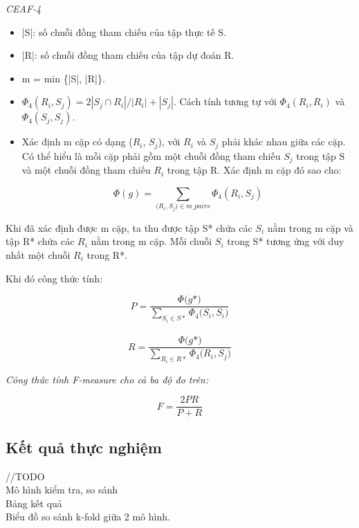 \documentclass[12pt]{report}
\begin{document}
					\textit{CEAF-4}
				\begin{itemize}
					\item{|S|: số chuỗi đồng tham chiếu của tập thực tế S.}
					\item{|R|: số chuỗi đồng tham chiếu của tập dự đoán R.}
					\item{m = min \{|S|, |R|\}.}
					\item{$\Phi_4(R_i,S_j) = 2 |S_j \cap R_i|/ |R_i| + |S_j|$. Cách tính tương tự với $\Phi_4(R_i,R_i)$ và $\Phi_4(S_j,S_j)$.}  
					\item{Xác định m cặp có dạng ($R_i$, $S_j$), với $R_i$ và $S_j$ phải khác nhau giữa các cặp. Có thể hiểu là mỗi cặp phải gồm một chuỗi đồng tham chiếu $S_j$ trong tập S và một chuỗi đồng tham chiếu $R_i$ trong tập R. Xác định m cặp đó sao cho: 
					\begin{center}
						\begin{equation*}
							\Phi(g) = \sum_{\big(R_i,S_j) \in m\_pairs} \Phi_4(R_i,S_j)
						\end{equation*}
					\end{center}}
				\end{itemize}
				\par Khi đã xác định được m cặp, ta thu được tập S* chứa các $S_i$ nằm trong m cặp và tập R* chứa các $R_i$ nằm trong m cặp. Mỗi chuỗi $S_i$ trong S* tương ứng với duy nhất một chuỗi $R_i$ trong R*.
				\par Khi đó công thức tính:						
					\begin{center}
						\begin{equation*}
							P = \frac{\Phi \big(g*)}{\sum_{S_i \in S*}\Phi_4 \big(S_i, S_i)}
						\end{equation*}
						\\
						\begin{equation*}
							R = \frac{\Phi \big(g*)}{\sum_{R_i \in R*}\Phi_4 \big(R_i, S_j)}
						\end{equation*}					
					\end{center}

			\par \textit{Công thức tính F-measure cho cả ba độ đo trên:}
				\begin{center}					
					\begin{equation*}
						F = \frac{2PR}{P+R}
					\end{equation*}
				\end{center}

		\subsection*{Kết quả thực nghiệm}
		//TODO
		\\Mô hình kiểm tra, so sánh
		\\Bảng kết quả
		\\Biểu đồ so sánh k-fold giữa 2 mô hình.
\end{document}
